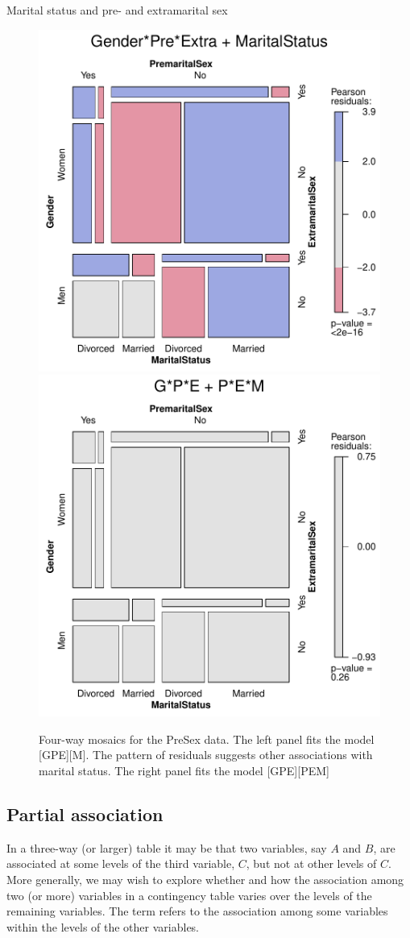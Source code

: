 \documentclass[11pt]{book}
\renewenvironment{knitrout}{\small\renewcommand{\baselinestretch}{.85}}{} %
\begin{document}
\begin{Example}[marital1]{Marital status and pre- and extramarital sex}
\begin{knitrout}
\begin{figure}[!htbp]
\centerline{\includegraphics[width=.49\textwidth]{ch05/fig/presex31} 
\includegraphics[width=.49\textwidth]{ch05/fig/presex32} }

\caption[Four-way mosaics for the PreSex data]{Four-way mosaics for the PreSex data. The left panel fits the model [GPE][M]. The pattern of residuals suggests other associations with marital status. The right panel fits the model [GPE][PEM]\label{fig:presex3}}
\end{figure}


\end{knitrout}

\end{Example}


\subsection{Partial association}\label{sec:mospart}

In a three-way (or larger) table it may be that two variables, say $A$ and $B$, are
associated at some levels of the third variable, $C$, but not at other
levels of $C$. More generally, we may wish to explore whether and how the
association among two (or more) variables in a contingency table varies over
the levels of the remaining variables. The term  refers
to the association among some variables within the levels of the other
variables.
\end{document}
